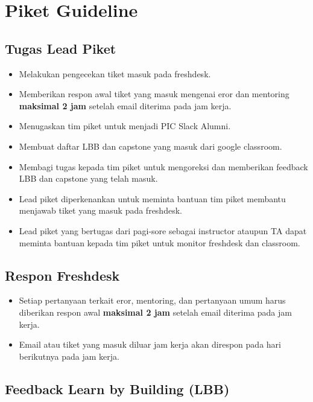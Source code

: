 \documentclass[
]{book}
\providecommand{\tightlist}{%
  \setlength{\itemsep}{0pt}\setlength{\parskip}{0pt}}
\begin{document}
\hypertarget{piket-guideline}{%
\chapter{Piket Guideline}\label{piket-guideline}}

\hypertarget{tugas-lead-piket}{%
\section{Tugas Lead Piket}\label{tugas-lead-piket}}

\begin{itemize}
\tightlist
\item
  Melakukan pengecekan tiket masuk pada freshdesk.
\item
  Memberikan respon awal tiket yang masuk mengenai eror dan mentoring \textbf{maksimal 2 jam} setelah email diterima pada jam kerja.
\item
  Menugaskan tim piket untuk menjadi PIC Slack Alumni.
\item
  Membuat daftar LBB dan capstone yang masuk dari google classroom.
\item
  Membagi tugas kepada tim piket untuk mengoreksi dan memberikan feedback LBB dan capstone yang telah masuk.
\item
  Lead piket diperkenankan untuk meminta bantuan tim piket membantu menjawab tiket yang masuk pada freshdesk.
\item
  Lead piket yang bertugas dari pagi-sore sebagai instructor ataupun TA dapat meminta bantuan kepada tim piket untuk monitor freshdesk dan classroom.
\end{itemize}

\hypertarget{respon-freshdesk}{%
\section{Respon Freshdesk}\label{respon-freshdesk}}

\begin{itemize}
\tightlist
\item
  Setiap pertanyaan terkait eror, mentoring, dan pertanyaan umum harus diberikan respon awal \textbf{maksimal 2 jam} setelah email diterima pada jam kerja.
\item
  Email atau tiket yang masuk diluar jam kerja akan direspon pada hari berikutnya pada jam kerja.
\end{itemize}

\hypertarget{feedback-learn-by-building-lbb}{%
\section{Feedback Learn by Building (LBB)}\label{feedback-learn-by-building-lbb}}
\end{document}
